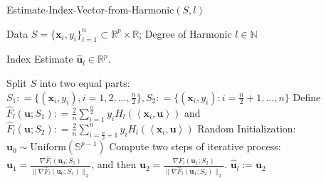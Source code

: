 \documentclass[final,12pt]{colt2018} %
\newcommand{\N}{\mathbb{N}}
\newcommand{\R}{\mathbb{R}}
\newcommand{\unitsphere}[1]{\mathbb{S}^{#1}}
\renewcommand\v[1]{{\ensuremath{\boldsymbol{#1}}}}
\newcommand\ip[1]{\left\langle #1 \right\rangle}
\begin{document}
\begin{algorithm}[t]
  \renewcommand\algorithmicrequire{\textbf{input}}
  \renewcommand\algorithmicensure{\textbf{output}}
  \caption{\textsf{Estimate-Index-Vector-from-Harmonic$(S,l)$}}
    \label{algorithm: fixed_harmonic}
  \begin{algorithmic}[1]
    \REQUIRE
    Data $S=\{\v x_i, y_i\}_{i=1}^n \subset \R^p \times \R$;
    Degree of Harmonic $l \in \N$

    \renewcommand\algorithmicrequire{\textbf{assume}}
    
    \ENSURE
    Index Estimate $\hat{\v u}_l \in \R^p$.

    \STATE Split $S$ into two equal parts: \newline
    $S_1: = \{(\v x_i, y_i), i=1,2,\dotsc, \frac{n}{2}\}, S_2: = \{(\v x_i, y_i): i=\frac{n}{2} + 1 , \dotsc, n\}$ \STATE Define
    $\hat{F}_l(\v u; S_1) : = \frac{2}{n} \sum_{i=1}^{\frac{n}{2}} y_i H_l(\ip{\v x_i, \v u})$ and %
    $\hat{F}_l(\v u; S_2) : = \frac{2}{n} \sum_{i=\frac{n}{2}+1}^{n} y_i H_l(\ip{\v x_i, \v u})$ 
    \STATE Random Initialization: 
    $\v u_0 \sim \text{Uniform}(\unitsphere{p-1})$ 
    \STATE Compute two steps of iterative process:
    $\v u_1 = \frac{\nabla \hat{F}_l(\v u_0; S_1)}{\| \nabla \hat{F}_l(\v u_0; S_1)\|_2}$, and then $\v u_2 =\frac{\nabla \hat{F}_l(\v u_1; S_2)}{\| \nabla \hat{F}_l(\v u_1; S_2)\|_2}$.  
\RETURN  $\hat{\v u}_l := \v u_2$
  \end{algorithmic}
\end{algorithm}
\end{document}
